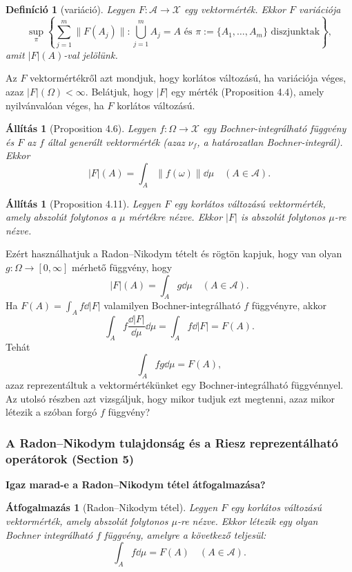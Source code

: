 \documentclass{beamer} %
\newtheorem{defi}[lem]{Definíció}
\newtheorem{allitas}[lem]{Állítás}
\newtheorem{atfog}[lem]{Átfogalmazás}
\begin{document}
\begin{frame}
\justifying
\begin{defi}[variáció]
Legyen $F\colon \mathcal{A} \to \mathcal{X}$ egy vektormérték. Ekkor $F$ variációja
$$\sup_{\pi} \left\lbrace \sum^{m}_{j=1} \| F(A_j) \| : \bigcup^{m}_{j=1} A_j = A \text{ és } \pi := \lbrace A_1, \ldots, A_m \rbrace \text{ diszjunktak} \right\rbrace,$$
amit $|F|(A)$-val jelölünk.
\end{defi}
\pause Az $F$ vektormértékről azt mondjuk, hogy korlátos változású, ha variációja véges, azaz $|F|(\Omega) < \infty.$ \pause Belátjuk, hogy $|F|$ egy mérték (Proposition 4.4), \pause amely nyilvánvalóan véges, ha $F$ korlátos változású.
\pause \begin{allitas}[Proposition 4.6] Legyen $f \colon \Omega \to \mathcal{X}$ egy Bochner-integrálható függvény és $F$ az $f$ által generált vektormérték (azaz $\nu_f$, a határozatlan Bochner-integrál). Ekkor 
$$|F|(A) = \int_{A} \| f(\omega) \| \dd{\mu} \quad (A \in \mathcal{A}).$$
\end{allitas}
\end{frame}

\begin{frame}
\justifying
\begin{allitas}[Proposition 4.11] Legyen $F$ egy korlátos változású vektormérték, amely abszolút folytonos a $\mu$ mértékre nézve. Ekkor $|F|$ is abszolút folytonos $\mu$-re nézve.
\end{allitas}
\pause Ezért használhatjuk a Radon\---Nikodym tételt és rögtön kapjuk, hogy van olyan $g \colon \Omega \to [0,\infty]$ mérhető függvény, hogy
$$|F|(A) = \int_{A} g \dd{\mu} \quad (A \in \mathcal{A}).$$ \pause Ha $F(A) = \int_{A} f \dd{|F|}$ valamilyen Bochner-integrálható $f$ függvényre, akkor
\pause $$\int_{A} f \frac{\dd{|F|}}{\dd{\mu}} \dd{\mu} = \int_{A} f \dd{|F|} = F(A).$$
\pause Tehát 
$$\int_{A} fg \dd{\mu} = F(A),$$
\pause azaz reprezentáltuk a vektormértékünket egy Bochner-integrálható függvénnyel. \pause Az utolsó részben azt vizsgáljuk, hogy mikor tudjuk ezt megtenni, azaz mikor létezik a szóban forgó $f$ függvény?
\end{frame}

\begin{frame}
\frametitle{A Radon\---Nikodym tulajdonság és a Riesz reprezentálható operátorok (Section 5)}
\justifying
\textbf{Igaz marad-e a Radon\---Nikodym tétel átfogalmazása?}
\pause \begin{atfog}[Radon\---Nikodym tétel] Legyen $F$ egy korlátos változású vektormérték, amely abszolút folytonos $\mu$-re nézve. Ekkor létezik egy olyan Bochner integrálható $f$ függvény, amelyre a következő teljesül:
$$\int_{A} f \dd{\mu} = F(A) \quad (A \in \mathcal{A}).$$
\end{atfog}
\end{frame}
\end{document}

